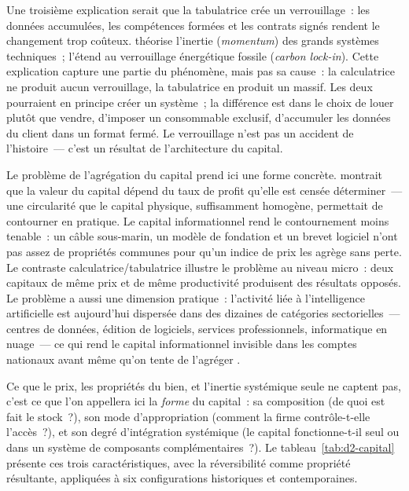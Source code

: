 Une troisième explication serait que la tabulatrice crée un verrouillage~: les données accumulées, les compétences formées et les contrats signés rendent le changement trop coûteux. \textcite{hughes_networks_1983} théorise l'inertie (\emph{momentum}) des grands systèmes techniques~; \textcite{unruh_understanding_2000} l'étend au verrouillage énergétique fossile (\emph{carbon lock-in}). Cette explication capture une partie du phénomène, mais pas sa cause~: la calculatrice ne produit aucun verrouillage, la tabulatrice en produit un massif. Les deux pourraient en principe créer un système~; la différence est dans le choix de louer plutôt que vendre, d'imposer un consommable exclusif, d'accumuler les données du client dans un format fermé. Le verrouillage n'est pas un accident de l'histoire~--- c'est un résultat de l'architecture du capital.

\markREG
Le problème de l'agrégation du capital prend ici une forme concrète. \textcite{robinson_production_1953} montrait que la valeur du capital dépend du taux de profit qu'elle est censée déterminer~--- une circularité que le capital physique, suffisamment homogène, permettait de contourner en pratique. Le capital informationnel rend le contournement moins tenable~: un câble sous-marin, un modèle de fondation et un brevet logiciel n'ont pas assez de propriétés communes pour qu'un indice de prix les agrège sans perte. Le contraste calculatrice/tabulatrice illustre le problème au niveau micro~: deux capitaux de même prix et de même productivité produisent des résultats opposés. Le problème a aussi une dimension pratique~: l'activité liée à l'intelligence artificielle est aujourd'hui dispersée dans des dizaines de catégories sectorielles~--- centres de données, édition de logiciels, services professionnels, informatique en nuage~--- ce qui rend le capital informationnel invisible dans les comptes nationaux avant même qu'on tente de l'agréger \parencite{korinek_mckelvey_2026}.

Ce que le prix, les propriétés du bien, et l'inertie systémique seule ne captent pas, c'est ce que l'on appellera ici la \emph{forme} du capital~: sa composition (de quoi est fait le stock~?), son mode d'appropriation (comment la firme contrôle-t-elle l'accès~?), et son degré d'intégration systémique (le capital fonctionne-t-il seul ou dans un système de composants complémentaires~?). Le tableau~\ref{tab:d2-capital} présente ces trois caractéristiques, avec la réversibilité comme propriété résultante, appliquées à six configurations historiques et contemporaines.


